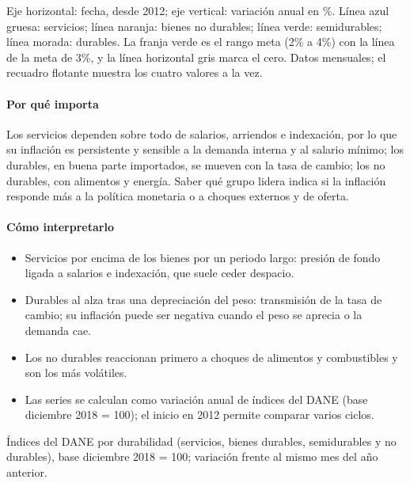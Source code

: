 \begin{leer}
Eje horizontal: fecha, desde 2012; eje vertical: variación anual en \%. Línea azul gruesa: servicios; línea naranja: bienes no durables; línea verde: semidurables; línea morada: durables. La franja verde es el rango meta (2\% a 4\%) con la línea de la meta de 3\%, y la línea horizontal gris marca el cero. Datos mensuales; el recuadro flotante muestra los cuatro valores a la vez.
\end{leer}

\paragraph{Por qué importa}
Los servicios dependen sobre todo de salarios, arriendos e indexación, por lo que su inflación es persistente y sensible a la demanda interna y al salario mínimo; los durables, en buena parte importados, se mueven con la tasa de cambio; los no durables, con alimentos y energía. Saber qué grupo lidera indica si la inflación responde más a la política monetaria o a choques externos y de oferta.

\paragraph{Cómo interpretarlo}
\begin{itemize}
\item Servicios por encima de los bienes por un periodo largo: presión de fondo ligada a salarios e indexación, que suele ceder despacio.
\item Durables al alza tras una depreciación del peso: transmisión de la tasa de cambio; su inflación puede ser negativa cuando el peso se aprecia o la demanda cae.
\item Los no durables reaccionan primero a choques de alimentos y combustibles y son los más volátiles.
\item Las series se calculan como variación anual de índices del DANE (base diciembre 2018 = 100); el inicio en 2012 permite comparar varios ciclos.
\end{itemize}
\begin{formulas}[Fórmulas]
\end{formulas}
\begin{metodo}[Metodología]
Índices del DANE por durabilidad (servicios, bienes durables, semidurables y no durables), base diciembre 2018 = 100; variación frente al mismo mes del año anterior.
\par{}
\end{metodo}


